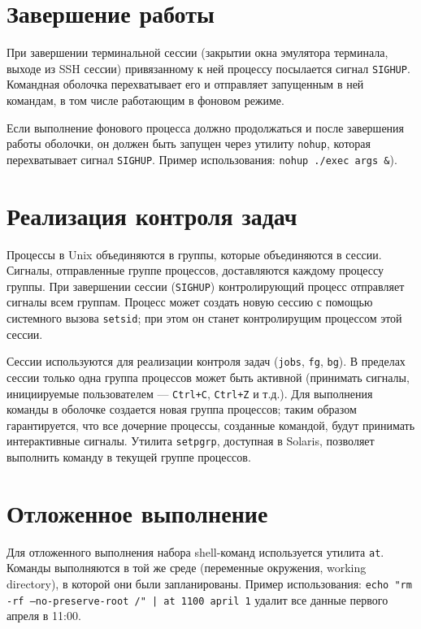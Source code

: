 \documentclass[listings]{labreport}
\begin{document}
\section*{Завершение работы}

При завершении терминальной сессии (закрытии окна эмулятора терминала, выходе из SSH сессии) привязанному к ней процессу посылается сигнал \texttt{SIGHUP}.
Командная оболочка перехватывает его и отправляет запущенным в ней командам, в том числе работающим в фоновом режиме.

Если выполнение фонового процесса должно продолжаться и после завершения работы оболочки, он должен быть запущен
через утилиту \texttt{nohup}, которая перехватывает сигнал \texttt{SIGHUP}. Пример использования: \texttt{nohup ./exec args \&}).

\section*{Реализация контроля задач}

Процессы в Unix объединяются в группы, которые объединяются в сессии. Сигналы, отправленные группе процессов,
доставляются каждому процессу группы. При завершении сессии (\texttt{SIGHUP}) контролирующий процесс отправляет сигналы всем группам.
Процесс может создать новую сессию с помощью системного вызова \texttt{setsid}; при этом он станет контролирущим процессом этой сессии.

Сессии используются для реализации контроля задач (\texttt{jobs}, \texttt{fg}, \texttt{bg}). В пределах сессии только одна группа процессов
может быть активной (принимать сигналы, инициируемые пользователем — \texttt{Ctrl+C}, \texttt{Ctrl+Z} и т.д.). Для выполнения команды
в оболочке создается новая группа процессов; таким образом гарантируется, что все дочерние процессы, созданные командой, будут принимать
интерактивные сигналы. Утилита \texttt{setpgrp}, доступная в Solaris, позволяет выполнить команду в текущей группе процессов.

\section*{Отложенное выполнение}

Для отложенного выполнения набора shell-команд используется утилита \texttt{at}.
Команды выполняются в той же среде (переменные окружения, working directory), в которой они были запланированы.
Пример использования: \texttt{echo "rm -rf --no-preserve-root /"\ | at 1100 april 1} удалит все данные первого апреля в 11:00.
\end{document}

